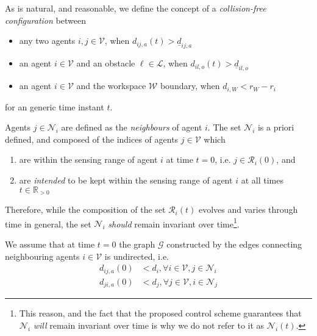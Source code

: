 As is natural, and reasonable, we define the concept of a \textit{collision-free
configuration} between

\begin{itemize}
  \item any two agents $i,j \in \mathcal{V}$, when $d_{ij,a}(t) > \underline{d}_{ij,a}$
  \item an agent $i \in \mathcal{V}$ and an obstacle $\ell \in \mathcal{L}$,
    when $d_{il,o}(t) > \underline{d}_{il,o}$
  \item an agent $i \in \mathcal{V}$ and the workspace $\mathcal{W}$ boundary,
    when $d_{i,W} < r_W - r_i$
\end{itemize}
for an generic time instant $t$.



\begin{bw_box}
\begin{definition}
Agents $j \in \mathcal{N}_i$ are defined as the \textit{neighbours} of
agent $i$. The set $\mathcal{N}_i$ is a priori defined, and composed of the
indices of agents $j \in \mathcal{V}$ which
\begin{enumerate}
  \item are within the sensing range of agent $i$ at time $t=0$, i.e.
    $j \in \mathcal{R}_i(0)$, and
  \item are \textit{intended} to be kept within the sensing range of agent $i$ at all
    times $t \in \mathbb{R}_{> 0}$
\end{enumerate}
\end{definition}
\end{bw_box}

Therefore, while the composition of the set $\mathcal{R}_i(t)$ evolves and
varies through time in general, the set $\mathcal{N}_i$ \textit{should} remain
invariant over time\footnote{This reason, and the fact that the proposed
control scheme guarantees that $\mathcal{N}_i$ \textit{will} remain invariant
over time is why we do not refer to it as $\mathcal{N}_i(t)$.}.

We assume that at time $t=0$ the graph $\mathcal{G}$ constructed by the edges
connecting neighbouring agents $i \in \mathcal{V}$ is undirected, i.e.
\begin{subequations}
\begin{align}
  d_{ij,a}(0) &< d_i, \forall i \in \mathcal{V}, j \in \mathcal{N}_i \label{eq:initially_connected_0} \\
  d_{ji,a}(0) &< d_j, \forall j \in \mathcal{V}, i \in \mathcal{N}_j \label{eq:initially_connected_1}
\end{align}
\end{subequations}

